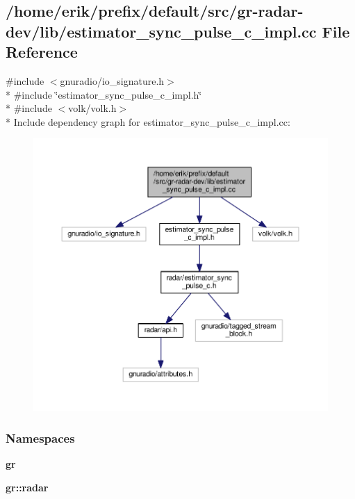 \subsection{/home/erik/prefix/default/src/gr-\/radar-\/dev/lib/estimator\+\_\+sync\+\_\+pulse\+\_\+c\+\_\+impl.cc File Reference}
\label{estimator__sync__pulse__c__impl_8cc}
{\ttfamily \#include $<$gnuradio/io\+\_\+signature.\+h$>$}\\*
{\ttfamily \#include \char`\"{}estimator\+\_\+sync\+\_\+pulse\+\_\+c\+\_\+impl.\+h\char`\"{}}\\*
{\ttfamily \#include $<$volk/volk.\+h$>$}\\*
Include dependency graph for estimator\+\_\+sync\+\_\+pulse\+\_\+c\+\_\+impl.\+cc\+:
\nopagebreak
\begin{figure}[H]
\begin{center}
\leavevmode
\includegraphics[width=350pt]{d3/d13/estimator__sync__pulse__c__impl_8cc__incl}
\end{center}
\end{figure}
\subsubsection*{Namespaces}
\begin{DoxyCompactItemize}
\item 
 {\bf gr}
\item 
 {\bf gr\+::radar}
\end{DoxyCompactItemize}
